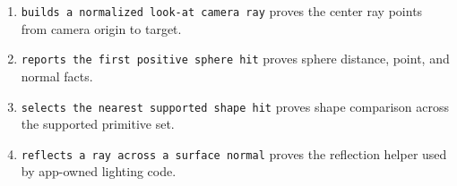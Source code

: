 \begin{enumerate}
\def\labelenumi{\arabic{enumi}.}
\tightlist
\item
  \texttt{b\allowbreak{}u\allowbreak{}i\allowbreak{}l\allowbreak{}d\allowbreak{}s\allowbreak{} \allowbreak{}a\allowbreak{} \allowbreak{}n\allowbreak{}o\allowbreak{}r\allowbreak{}m\allowbreak{}a\allowbreak{}l\allowbreak{}i\allowbreak{}z\allowbreak{}e\allowbreak{}d\allowbreak{} \allowbreak{}l\allowbreak{}o\allowbreak{}o\allowbreak{}k\allowbreak{}-\allowbreak{}a\allowbreak{}t\allowbreak{} \allowbreak{}c\allowbreak{}a\allowbreak{}m\allowbreak{}e\allowbreak{}r\allowbreak{}a\allowbreak{} \allowbreak{}r\allowbreak{}a\allowbreak{}y} proves the center ray points from camera origin to target.
\item
  \texttt{r\allowbreak{}e\allowbreak{}p\allowbreak{}o\allowbreak{}r\allowbreak{}t\allowbreak{}s\allowbreak{} \allowbreak{}t\allowbreak{}h\allowbreak{}e\allowbreak{} \allowbreak{}f\allowbreak{}i\allowbreak{}r\allowbreak{}s\allowbreak{}t\allowbreak{} \allowbreak{}p\allowbreak{}o\allowbreak{}s\allowbreak{}i\allowbreak{}t\allowbreak{}i\allowbreak{}v\allowbreak{}e\allowbreak{} \allowbreak{}s\allowbreak{}p\allowbreak{}h\allowbreak{}e\allowbreak{}r\allowbreak{}e\allowbreak{} \allowbreak{}h\allowbreak{}i\allowbreak{}t} proves sphere distance, point, and normal facts.
\item
  \texttt{s\allowbreak{}e\allowbreak{}l\allowbreak{}e\allowbreak{}c\allowbreak{}t\allowbreak{}s\allowbreak{} \allowbreak{}t\allowbreak{}h\allowbreak{}e\allowbreak{} \allowbreak{}n\allowbreak{}e\allowbreak{}a\allowbreak{}r\allowbreak{}e\allowbreak{}s\allowbreak{}t\allowbreak{} \allowbreak{}s\allowbreak{}u\allowbreak{}p\allowbreak{}p\allowbreak{}o\allowbreak{}r\allowbreak{}t\allowbreak{}e\allowbreak{}d\allowbreak{} \allowbreak{}s\allowbreak{}h\allowbreak{}a\allowbreak{}p\allowbreak{}e\allowbreak{} \allowbreak{}h\allowbreak{}i\allowbreak{}t} proves shape comparison across the supported primitive set.
\item
  \texttt{r\allowbreak{}e\allowbreak{}f\allowbreak{}l\allowbreak{}e\allowbreak{}c\allowbreak{}t\allowbreak{}s\allowbreak{} \allowbreak{}a\allowbreak{} \allowbreak{}r\allowbreak{}a\allowbreak{}y\allowbreak{} \allowbreak{}a\allowbreak{}c\allowbreak{}r\allowbreak{}o\allowbreak{}s\allowbreak{}s\allowbreak{} \allowbreak{}a\allowbreak{} \allowbreak{}s\allowbreak{}u\allowbreak{}r\allowbreak{}f\allowbreak{}a\allowbreak{}c\allowbreak{}e\allowbreak{} \allowbreak{}n\allowbreak{}o\allowbreak{}r\allowbreak{}m\allowbreak{}a\allowbreak{}l} proves the reflection helper used by app-owned lighting code.

\end{enumerate}

